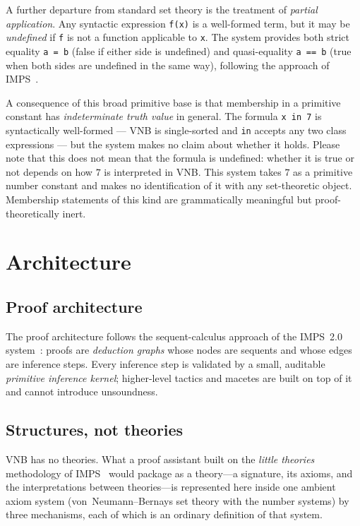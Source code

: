A further departure from standard set theory is the treatment of
\emph{partial application}.  Any syntactic expression \texttt{f(x)}
is a well-formed term, but it may be \emph{undefined} if \texttt{f} is
not a function applicable to \texttt{x}.  The system provides both
strict equality \texttt{a = b} (false if either side is undefined) and
quasi-equality \texttt{a == b} (true when both sides are undefined in
the same way), following the approach of IMPS~\cite{IMPS}.

A consequence of this broad primitive base is that membership in a
primitive constant has \emph{indeterminate truth value} in general.
The formula \texttt{x in 7} is syntactically well-formed --- VNB is
single-sorted and \texttt{in} accepts any two class expressions ---
but the system makes no claim about whether it holds. Please note that
this does not mean that the formula is undefined: whether it is true
or not depends on how $7$ is interpreted in VNB. This system
takes $7$ as a primitive number constant and makes no identification
of it with any set-theoretic object.  Membership statements of this
kind are grammatically meaningful but proof-theoretically inert.

\section{Architecture}
\label{sec:architecture}

\subsection{Proof architecture}

\begin{sloppypar}
The proof architecture follows the sequent-calculus approach of the
IMPS~2.0 system~\cite{IMPS}: proofs are \emph{deduction graphs} whose
nodes are sequents and whose edges are inference steps.  Every inference
step is validated by a small, auditable \emph{primitive inference kernel};
higher-level tactics and macetes are built on top of it and cannot
introduce unsoundness.
\end{sloppypar}

\subsection{Structures, not theories}
\label{sec:structures-not-theories}

VNB has no theories.  What a proof assistant built on the \emph{little
theories} methodology of IMPS~\cite{IMPS} would package as a theory---a
signature, its axioms, and the interpretations between theories---is
represented here inside one ambient axiom system (von~Neumann--Bernays set
theory with the number systems) by three mechanisms, each of which is an
ordinary definition of that system.

